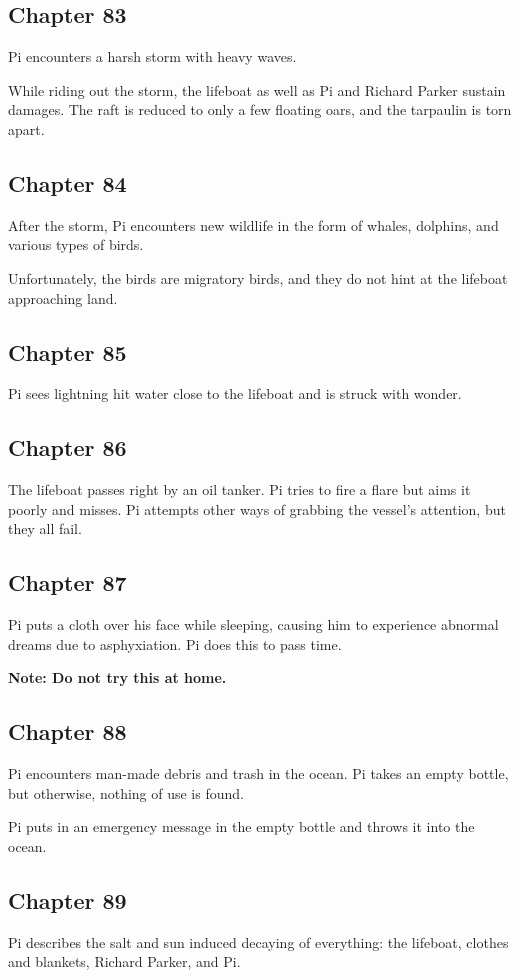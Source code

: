 \documentclass[11pt]{article}
\begin{document}
\subsection{Chapter 83}
\label{sec:org6bc8502}
Pi encounters a harsh storm with heavy waves.

While riding out the storm, the lifeboat as well as Pi and Richard Parker sustain damages. The raft is reduced to only a few floating oars, and the tarpaulin is torn apart.
\subsection{Chapter 84}
\label{sec:org7752b12}
After the storm, Pi encounters new wildlife in the form of whales, dolphins, and various types of birds.

Unfortunately, the birds are migratory birds, and they do not hint at the lifeboat approaching land.
\subsection{Chapter 85}
\label{sec:orga75281e}
Pi sees lightning hit water close to the lifeboat and is struck with wonder.
\subsection{Chapter 86}
\label{sec:orged022e0}
The lifeboat passes right by an oil tanker. Pi tries to fire a flare but aims it poorly and misses. Pi attempts other ways of grabbing the vessel's attention, but they all fail.
\subsection{Chapter 87}
\label{sec:orgdac5f37}
Pi puts a cloth over his face while sleeping, causing him to experience abnormal dreams due to asphyxiation. Pi does this to pass time.

\textbf{Note: Do not try this at home.}
\subsection{Chapter 88}
\label{sec:orge5b4365}
Pi encounters man-made debris and trash in the ocean. Pi takes an empty bottle, but otherwise, nothing of use is found.

Pi puts in an emergency message in the empty bottle and throws it into the ocean.
\subsection{Chapter 89}
\label{sec:orgfde5b73}
Pi describes the salt and sun induced decaying of everything: the lifeboat, clothes and blankets, Richard Parker, and Pi.
\end{document}
